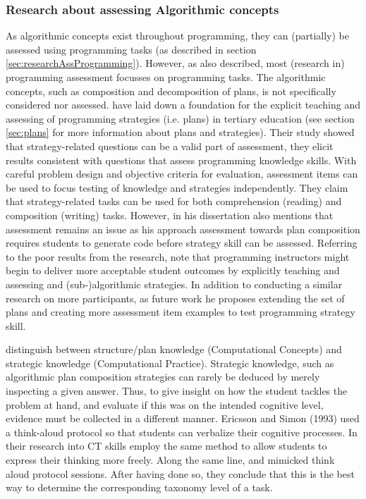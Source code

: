 \subsubsection{Research about assessing Algorithmic concepts}
As algorithmic concepts exist throughout programming, they can (partially) be assessed using programming tasks (as described in section \ref{sec:researchAssProgramming}). However, as also described, most (research in) programming assessment focusses on programming tasks. The algorithmic concepts, such as composition and decomposition of plans, is not specifically considered nor assessed.  have laid down a foundation for the explicit teaching and assessing of programming strategies (i.e. plans) in tertiary education (see section \ref{sec:plans} for more information about plans and strategies). Their study showed that strategy-related questions can be a valid part of assessment, they elicit results consistent with questions that assess programming knowledge skills. With careful problem design and objective criteria for evaluation, assessment items can be used to focus testing of knowledge and strategies independently. They claim that strategy-related tasks can be used for both comprehension (reading) and composition (writing) tasks. However, in his dissertation \citeauthor{deRaadt2008} also mentions that assessment remains an issue as his approach assessment towards plan composition requires students to generate code before strategy skill can be assessed. Referring to the poor results from the  research,  note that programming instructors might begin to deliver more acceptable student outcomes by explicitly teaching and assessing and (sub-)algorithmic strategies. In addition to conducting a similar research on more participants, as future work he proposes extending the set of plans and creating more assessment item examples to test programming strategy skill.



 distinguish between structure/plan knowledge (Computational Concepts) and strategic knowledge (Computational Practice). Strategic knowledge, such as algorithmic plan composition strategies can rarely be deduced by merely inspecting a given answer. Thus, to give insight on how the student tackles the problem at hand, and evaluate if this was on the intended cognitive level, evidence must be collected in a different manner.  Ericsson and Simon (1993) used a think-aloud protocol so that students can verbalize their cognitive processes. In their research into CT skills  employ the same method to allow students to express their thinking more freely. Along the same line,  and  mimicked  think aloud protocol sessions. After having done so, they conclude that this is the best way to determine the corresponding taxonomy level of a task.




